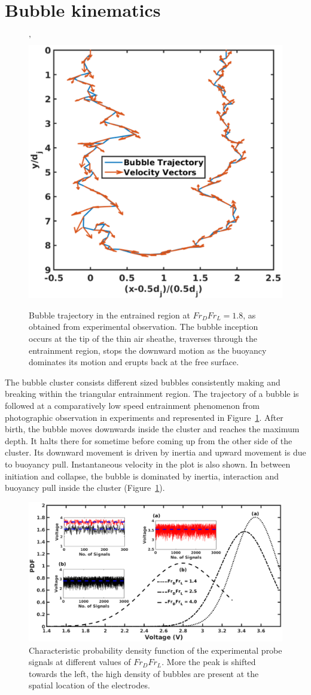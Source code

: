 \section{Bubble kinematics}
\begin{figure}
	\centering'
	\includegraphics[width=0.5\linewidth]{chapters/jetPool/Figure19}
	\caption{Bubble trajectory in the entrained region at $Fr_DFr_L = 1.8$, as obtained from experimental observation. The bubble inception occurs at the tip of the thin air sheathe, traverses through the entrainment region, stops the downward motion as the buoyancy dominates its motion and erupts back at the free surface.}
	\label{Figure::bubble}
\end{figure}
The bubble cluster consists different sized bubbles consistently making and breaking within the triangular entrainment region. The trajectory of a bubble is followed at a comparatively low speed entrainment phenomenon from photographic observation in experiments and represented in Figure~\ref{Figure::bubble}. After birth, the bubble moves downwards inside the cluster and reaches the maximum depth. It halts there for sometime before coming up from the other side of the cluster. Its downward movement is driven by inertia and upward movement is due to buoyancy pull. Instantaneous velocity in the plot is also shown. In between initiation and collapse, the bubble is dominated by inertia, interaction and buoyancy pull inside the cluster (Figure~\ref{Figure::bubble}). \\
\begin{figure}
	\centering
	\includegraphics[width=\linewidth]{chapters/jetPool/Figure20}
	\caption{Characteristic probability density function of the experimental probe signals at different values of $Fr_DFr_L$. More the peak is shifted towards the left, the high density of bubbles are present at the spatial location of the electrodes.}
	\label{Figure::pdf}
\end{figure}
